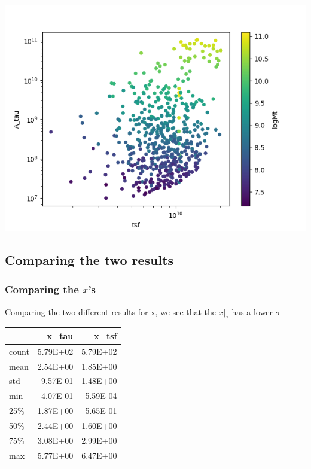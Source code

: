 \documentclass[a4paper,twocolumn]{article}
\begin{document}
\begin{center}
\includegraphics[width=.9\linewidth]{figs/T-A_tau.png}
\end{center}

\subsection{Comparing the two results}
\label{sec:org26db3cc}

\subsubsection{Comparing the \(x\)'s}
\label{sec:orga60f19a}


Comparing the two different results for x, we see that the \(x|_\tau\) has a lower \(\sigma\)

\begin{table}[hc]
\centering
\begin{tabular}{lrr}
\toprule
{} &    x\_tau &    x\_tsf \\
\midrule
count & 5.79E+02 & 5.79E+02 \\
mean  & 2.54E+00 & 1.85E+00 \\
std   & 9.57E-01 & 1.48E+00 \\
min   & 4.07E-01 & 5.59E-04 \\
25\%   & 1.87E+00 & 5.65E-01 \\
50\%   & 2.44E+00 & 1.60E+00 \\
75\%   & 3.08E+00 & 2.99E+00 \\
max   & 5.77E+00 & 6.47E+00 \\
\bottomrule
\end{tabular}
\end{table}
\end{document}
